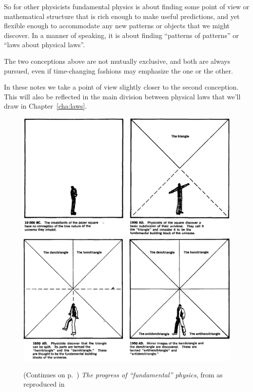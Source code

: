 \documentclass[a4paper,12pt,%
onecolumn,oneside,%
british%
]{memoir}
\renewcommand*{\|}[1][]{\nonscript\:#1\vert\nonscript\:\mathopen{}}
\newcommand*{\chap}{Chapter}%
\begin{document}
So for other physicists fundamental physics is about finding some point of view or mathematical structure that is rich enough to make useful predictions, and yet flexible enough to accommodate any new patterns or objects that we might discover. In a manner of speaking, it is about finding \enquote{patterns of patterns} or \enquote{laws about physical laws}.

The two conceptions above are not mutually exclusive, and both are always pursued, even if time-changing fashions may emphasize the one or the other.

In these notes we take a point of view slightly closer to the second conception. This will also be reflected in the main division between physical laws that we'll draw in \chap~\ref{cha:laws}.


\begin{figure}[p]
  \centering
  \includegraphics[width=1.2\textwidth]{images/chew1.png}
  \\[1em]  \includegraphics[width=1.2\textwidth]{images/chew2.png}
  \caption{(Continues on p.~\pageref{fig:chew2}) \emph{The progress of \enquote{fundamental} physics}, from \cites{chew1970} as reproduced in \cites{truesdell1984_r1987}}
  \label{fig:chew1}
\end{figure}
\end{document}
